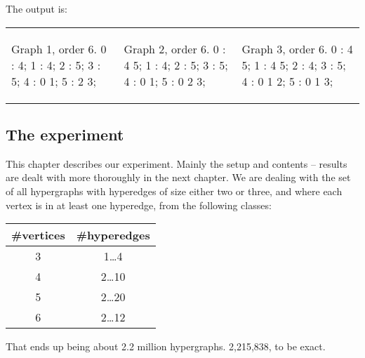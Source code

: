 The output is:

\begin{tabular}{|p{1.5in} | p{1.5in} | p{1.5in} |}
\begin{minipage}{1.5in}
\begin{datalisting}
Graph 1, order 6.
  0 : 4;
  1 : 4;
  2 : 5;
  3 : 5;
  4 : 0 1;
  5 : 2 3;

\end{datalisting}
\end{minipage}
&
\begin{minipage}{1.5in}
\begin{datalisting}
Graph 2, order 6.
  0 : 4 5;
  1 : 4;
  2 : 5;
  3 : 5;
  4 : 0 1;
  5 : 0 2 3;
\end{datalisting}
\end{minipage}
&
\begin{minipage}{1.5in}
\begin{datalisting}
Graph 3, order 6.
  0 : 4 5;
  1 : 4 5;
  2 : 4;
  3 : 5;
  4 : 0 1 2;
  5 : 0 1 3;
\end{datalisting}
\end{minipage}
\\
\end{tabular}


\subsection{The experiment}
\label{sec:experiment1}

This chapter describes our experiment. Mainly the setup and contents -- results are dealt with more thoroughly in the next chapter.
We are dealing with the set of all hypergraphs with hyperedges of size either two or three, and where each vertex is in at least one hyperedge, from the following classes:

\begin{tabular}{ c | c }
\#vertices & \#hyperedges \\ \hline
3&1\ldots4 \\ \hline
4&2\ldots10 \\ \hline
5&2\ldots20 \\ \hline
6&2\ldots12 \\ \hline
\end{tabular}

That ends up being about 2.2 million hypergraphs. 2,215,838, to be exact.

